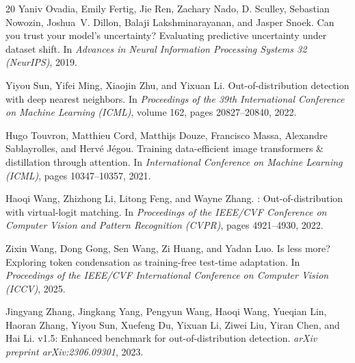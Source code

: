 \documentclass{article}
\begin{document}
\begin{thebibliography}{20}
Yaniv Ovadia, Emily Fertig, Jie Ren, Zachary Nado, D. Sculley, Sebastian Nowozin, Joshua~V. Dillon, Balaji Lakshminarayanan, and Jasper Snoek.
\newblock Can you trust your model's uncertainty? {E}valuating predictive uncertainty under dataset shift.
\newblock In \emph{Advances in Neural Information Processing Systems 32 (NeurIPS)}, 2019.

Yiyou Sun, Yifei Ming, Xiaojin Zhu, and Yixuan Li.
\newblock Out-of-distribution detection with deep nearest neighbors.
\newblock In \emph{Proceedings of the 39th International Conference on Machine Learning (ICML)}, volume 162, pages 20827--20840, 2022.

Hugo Touvron, Matthieu Cord, Matthijs Douze, Francisco Massa, Alexandre Sablayrolles, and Herv{\'e} J{\'e}gou.
\newblock Training data-efficient image transformers \& distillation through attention.
\newblock In \emph{International Conference on Machine Learning (ICML)}, pages 10347--10357, 2021.

Haoqi Wang, Zhizhong Li, Litong Feng, and Wayne Zhang.
: Out-of-distribution with virtual-logit matching.
\newblock In \emph{Proceedings of the IEEE/CVF Conference on Computer Vision and Pattern Recognition (CVPR)}, pages 4921--4930, 2022.

Zixin Wang, Dong Gong, Sen Wang, Zi Huang, and Yadan Luo.
\newblock Is less more? {E}xploring token condensation as training-free test-time adaptation.
\newblock In \emph{Proceedings of the IEEE/CVF International Conference on Computer Vision (ICCV)}, 2025.

Jingyang Zhang, Jingkang Yang, Pengyun Wang, Haoqi Wang, Yueqian Lin, Haoran Zhang, Yiyou Sun, Xuefeng Du, Yixuan Li, Ziwei Liu, Yiran Chen, and Hai Li.
 v1.5: Enhanced benchmark for out-of-distribution detection.
\newblock \emph{arXiv preprint arXiv:2306.09301}, 2023.

\end{thebibliography}
\end{document}
